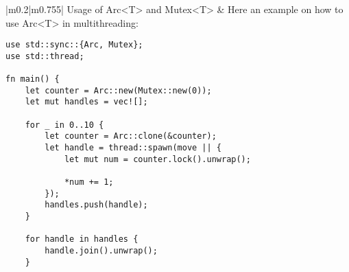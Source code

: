 \documentclass[main.tex,fontsize=8pt,paper=a4,paper=portrait,DIV=calc,]{scrartcl}
\begin{document}
\begin{table}[ht!]
\begin{tabular}{|m{0.2\linewidth}|m{0.755\linewidth}|}
\hline
Usage of Arc<T> and Mutex<T> & 
Here an example on how to use Arc<T> in multithreading:\newline
\begin{lstlisting}
use std::sync::{Arc, Mutex};
use std::thread;

fn main() {
    let counter = Arc::new(Mutex::new(0));
    let mut handles = vec![];

    for _ in 0..10 {
        let counter = Arc::clone(&counter);
        let handle = thread::spawn(move || {
            let mut num = counter.lock().unwrap();

            *num += 1;
        });
        handles.push(handle);
    }

    for handle in handles {
        handle.join().unwrap();
    }


\end{lstlisting}
\end{tabular}
\end{table}
\end{document}

